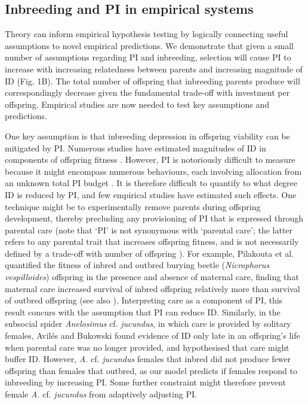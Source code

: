 \documentclass[12pt]{article}
\begin{document}
\subsection*{Inbreeding and PI in empirical systems}

Theory can inform empirical hypothesis testing by logically connecting {\color{blue}useful} assumptions to novel empirical predictions. We demonstrate that given a small number of assumptions regarding PI and inbreeding, selection will cause PI to increase with increasing relatedness between parents and increasing magnitude of ID (Fig. 1B). The total number of offspring that inbreeding parents produce will correspondingly decrease given the fundamental trade-off with investment per offspring. Empirical studies are now needed to test key assumptions and predictions.

One key assumption is that inbreeding depression in offspring viability can be mitigated by PI. Numerous studies have estimated magnitudes of ID in components of offspring fitness \cite[][]{Keller2002, Charlesworth2009, Szulkin2012}. However, PI is notoriously difficult to measure because it might encompass numerous behaviours, each involving allocation from an unknown total PI budget \cite[][]{Parker2002}. It is therefore difficult to quantify to what degree ID is reduced by PI, and few empirical studies have estimated such effects. {\color{blue}One technique might be to experimentally remove parents during offspring development, thereby precluding any provisioning of PI that is expressed through parental care (note that `PI' is not synonymous with `parental care'; the latter refers to any parental trait that increases offspring fitness, and is not necessarily defined by a trade-off with number of offspring \cite{Gardner2011a, Royle2012}). For example,} Pilakouta et al. \cite{Pilakouta2015} quantified the fitness of inbred and outbred burying beetle (\textit{Nicrophorus vespilloides}) offspring in the presence and absence of maternal care, finding that maternal care increased survival of inbred offspring relatively more than survival of outbred offspring {\color{blue}(see also \cite{Pilakouta2016})}. Interpreting care as a component of PI, this result concurs with the assumption that PI can reduce ID. Similarly, in the subsocial spider \textit{Anelosimus} cf. \textit{jucundus}, in which care is provided by solitary females, Avil{\'{e}}s and Bukowski \cite{Aviles2006} found evidence of ID only late in an offspring's life when parental care was no longer provided, and hypothesised that care might buffer ID. However, \textit{A.} cf. \textit{jucundus} females that inbred did not produce fewer offspring than females that outbred, as our model predicts if females respond to inbreeding by increasing PI. Some further constraint might therefore prevent female \textit{A.} cf. \textit{jucundus} from adaptively adjusting PI.
\end{document}
